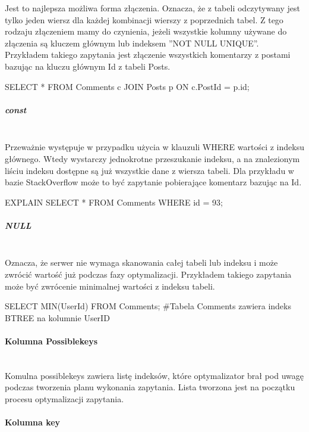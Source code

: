 Jest to najlepsza możliwa forma złączenia. Oznacza, że z tabeli odczytywany jest tylko jeden wiersz dla każdej kombinacji wierszy z poprzednich tabel. Z tego rodzaju złączeniem mamy do czynienia, jeżeli wszystkie kolumny używane do złączenia są kluczem głównym lub indeksem ''NOT NULL UNIQUE''. Przykładem takiego zapytania jest złączenie wszystkich komentarzy z postami bazując na kluczu głównym Id z tabeli Posts. 

\begin{spverbatim}
	SELECT * FROM Comments c JOIN Posts p ON c.PostId = p.id;
\end{spverbatim}

\subparagraph{const}\leavevmode\\
Przeważnie występuje w przypadku użycia w klauzuli WHERE wartości z indeksu głównego. Wtedy wystarczy jednokrotne przeszukanie indeksu, a na znalezionym liściu indeksu dostępne są już wszystkie dane z wiersza tabeli. Dla przykładu w bazie StackOverflow może to być zapytanie pobierające komentarz bazując na Id.
\begin{spverbatim}
	EXPLAIN SELECT * FROM Comments WHERE id = 93;
\end{spverbatim}

\subparagraph{NULL}\leavevmode\\
Oznacza, że serwer nie wymaga skanowania całej tabeli lub indeksu i może zwrócić wartość już podczas fazy optymalizacji. Przykładem takiego zapytania może być zwrócenie minimalnej wartości z indeksu tabeli.

\begin{spverbatim}
	SELECT MIN(UserId) FROM Comments;
	#Tabela Comments zawiera indeks BTREE na kolumnie UserID
\end{spverbatim}

\paragraph{Kolumna Possible\textunderscore keys}\leavevmode\\

Komulna possible\textunderscore keys zawiera listę indeksów, które optymalizator brał pod uwagę podczas tworzenia planu wykonania zapytania. Lista tworzona jest na początku procesu optymalizacji zapytania.

\paragraph{Kolumna key}\leavevmode\\

